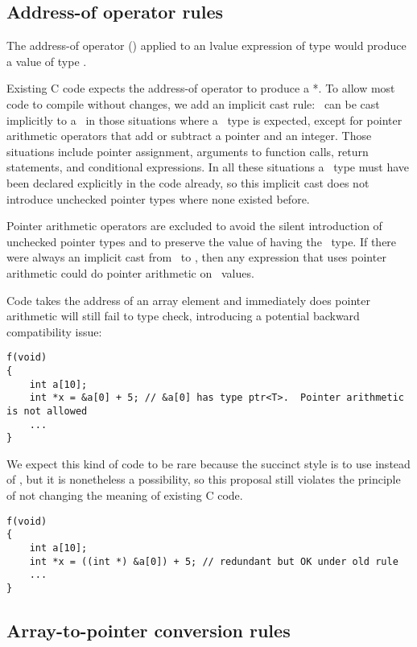 \subsection{Address-of operator rules}

The address-of operator (\code{&}) applied to an lvalue expression of
type  would produce a value of type
\ptrT.

Existing C code expects the address-of operator to produce a  *.
To allow most code to compile without changes, we add an implicit cast
rule: \ptrT\ can be cast
implicitly to a \uncheckedptrT\ in those situations where a \uncheckedptrT\ 
type is expected, except for pointer arithmetic operators
that add or subtract a pointer and an integer. Those situations include
pointer assignment, arguments to function calls, return statements, and
conditional expressions. In all these situations a \uncheckedptrT\
type must have been declared explicitly in the code already, so this
implicit cast does not introduce unchecked pointer types where none existed
before.

Pointer arithmetic operators are excluded to avoid the silent
introduction of unchecked pointer types and to preserve the value of having
the \ptrT\ type. If
there were always an implicit cast from \ptrT\ to \uncheckedptrT,
then any expression that uses pointer arithmetic could do pointer
arithmetic on \ptrT\
values.

Code takes the address of an array element and immediately does pointer
arithmetic will still fail to type check, introducing a potential
backward compatibility issue:
\begin{lstlisting}
f(void)
{
    int a[10];
    int *x = &a[0] + 5; // &a[0] has type ptr<T>.  Pointer arithmetic is not allowed
    ...
}
\end{lstlisting}

We expect this kind of code to be rare because the succinct style is to
use \code{a} instead of , but it is nonetheless a
possibility, so this proposal still violates the principle of not
changing the meaning of existing C code.

\begin{lstlisting}
f(void)
{
    int a[10];
    int *x = ((int *) &a[0]) + 5; // redundant but OK under old rule
    ...
}
\end{lstlisting}

\subsection{Array-to-pointer conversion rules}

